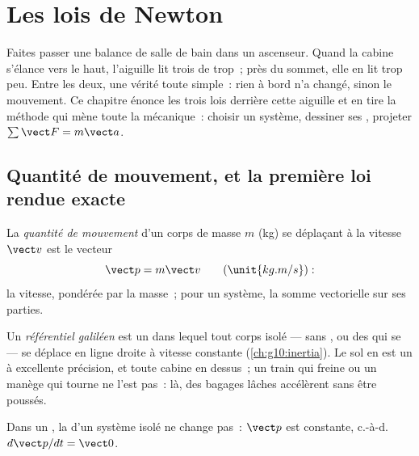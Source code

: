 \chapter{Les lois de Newton}\label{ch:g12:newtons-laws}

Faites passer une balance de salle de bain dans un ascenseur. Quand la
cabine s'élance vers le haut, l'aiguille lit trois
 de trop~; près du sommet, elle en lit trop peu.
Entre les deux, une vérité toute simple~: rien à bord n'a changé,
sinon le mouvement. Ce chapitre énonce les trois lois derrière cette
aiguille et en tire la méthode qui mène toute la mécanique~: choisir un
système, dessiner ses , projeter
$\sum \vect F = m\vect a$.

\section{Quantité de mouvement, et la première loi rendue exacte}

\begin{definition}\label{def:g12:newtons-laws:momentum}
La \emph{quantité de mouvement} d'un corps
de masse $m$ (\unit{kg}) se déplaçant à la vitesse $\vect v$ est le
vecteur
\[
\vect p = m \vect v \qquad (\unit{kg.m/s}):
\]
la vitesse, pondérée par la masse~; pour un système, la somme vectorielle
sur ses parties.
\end{definition}

\begin{definition}\label{def:g12:newtons-laws:inertial}
Un \emph{référentiel galiléen} est un
 dans lequel tout corps isolé --- sans
, ou des  qui
se  --- se déplace en ligne droite à vitesse
constante (\cref{ch:g10:inertia}). Le sol en est un à excellente
précision, et toute cabine en  dessus~; un
train qui freine ou un manège qui tourne ne l'est pas~: là, des bagages
lâches accélèrent sans être poussés.
\end{definition}

\begin{theorem}\label{thm:g12:newtons-laws:first}
Dans un , la  d'un
système isolé ne change pas~: $\vect p$ est constante, c.-à-d.\
$d\vect p/dt = \vect 0$.
\end{theorem}
\admitted

